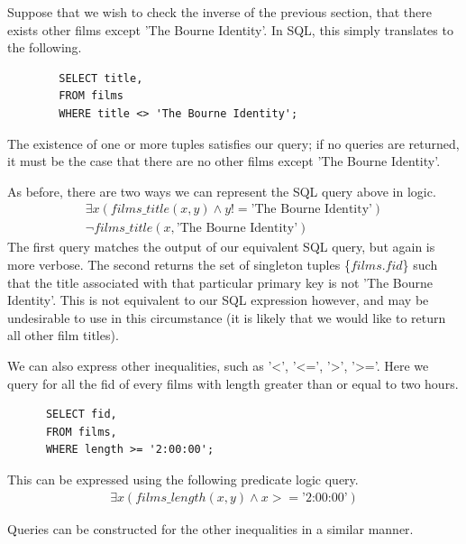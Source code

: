 \documentclass[a4paper, 11pt]{article}
\begin{document}
      Suppose that we wish to check the inverse of the previous section, that
      there exists other films except 'The Bourne Identity'. In SQL, this
      simply translates to the following.

      \begin{verbatim}
        SELECT title,
        FROM films
        WHERE title <> 'The Bourne Identity';
      \end{verbatim}

      The existence of one or more tuples satisfies our query; if no queries
      are returned, it must be the case that there are no other films except
      'The Bourne Identity'.

      As before, there are two ways we can represent the SQL query above in
      logic.
      \begin{gather}
        \exists x(films\_title(x, y) \land y !=  \text{'The Bourne
        Identity'})\label{where3}\\
        \lnot films\_title(x, \text{'The Bourne Identity'})\label{where4}
      \end{gather}
      The first query matches the output of our equivalent SQL query, but again
      is more verbose. The second returns the set of singleton tuples
      \{$films.fid$\} such that the title associated with that particular
      primary key is not 'The Bourne Identity'. This is not equivalent to our
      SQL expression however, and may be undesirable to use in this
      circumstance (it is likely that we would like to return all other film
      titles).


      We can also express other inequalities, such as '<', '<=', '>', '>='.
      Here we query for all the fid of every films with length greater than or
      equal to two hours.

      \begin{verbatim}
      SELECT fid,
      FROM films,
      WHERE length >= '2:00:00';
      \end{verbatim}

      This can be expressed using the following predicate logic query.
      \begin{gather}
        \exists x(films\_length(x, y) \land x >= \text{'2:00:00'}) \label{where5}
      \end{gather}

      Queries can be constructed for the other inequalities in a
      similar manner.
\end{document}
